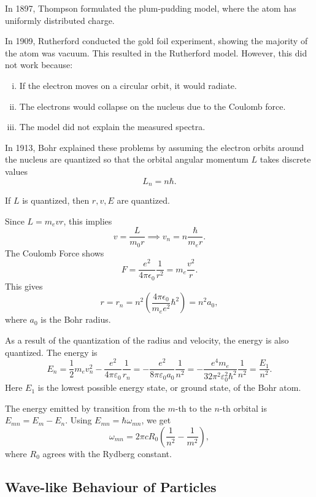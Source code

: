 \documentclass[12pt]{article}
\begin{document}
In 1897, Thompson formulated the plum-pudding model, where the atom has uniformly distributed charge.

In 1909, Rutherford conducted the gold foil experiment, showing the majority of the atom was vacuum. This resulted in the Rutherford model. However, this did not work because:
\begin{enumerate}[(i)]
	\item If the electron moves on a circular orbit, it would radiate.
	\item The electrons would collapse on the nucleus due to the Coulomb force.
	\item The model did not explain the measured spectra.
\end{enumerate}

In 1913, Bohr explained these problems by assuming the electron orbits around the nucleus are quantized so that the orbital angular momentum $L$ takes discrete values
\[
L_n = n \hbar
.\]
\begin{proposition}
	If $L$ is quantized, then $r, v, E$ are quantized.
\end{proposition}

\begin{proofbox}
Since $L = m_e v r$, this implies
\[
v = \frac{L}{m_0 r} \implies v_n = n \frac{\hbar}{m_e r}
.\]
The Coulomb Force shows
\[
	F = \frac{e^2}{4 \pi \epsilon_0} \frac{1}{r^2} = m_e \frac{v^2}{r}
.\]
This gives
\[
	r = r_n = n^2 \left( \frac{4 \pi \epsilon_0}{m_e e^2}\hbar ^2 \right) = n^2 a_0
,\]
where $a_0$ is the Bohr radius.

As a result of the quantization of the radius and velocity, the energy is also quantized. The energy is
\[
E_n = \frac{1}{2} m_e v_n^2 - \frac{e^2}{4 \pi \varepsilon_0} \frac{1}{r_n} = - \frac{e^2}{8 \pi \varepsilon_0 a_0} \frac{1}{n^2} = - \frac{e^{4} m_e}{32 \pi^2 \varepsilon_0^2 \hbar^2} \frac{1}{n^2} = \frac{E_1}{n^2}
.\]
Here $E_1$ is the lowest possible energy state, or ground state, of the Bohr atom.
\end{proofbox}


The energy emitted by transition from the $m$-th to the $n$-th orbital is $E_{mn} = E_m - E_n$. Using $E_{mn} = \hbar \omega_{mn}$, we get
\[
	\omega_{mn} = 2 \pi c R_0 \left( \frac{1}{n^2} - \frac{1}{m^2} \right)
,\]
where $R_0$ agrees with the Rydberg constant.

\subsection{Wave-like Behaviour of Particles}%
\label{sub:wave_like_behaviour_of_particles}
\end{document}
